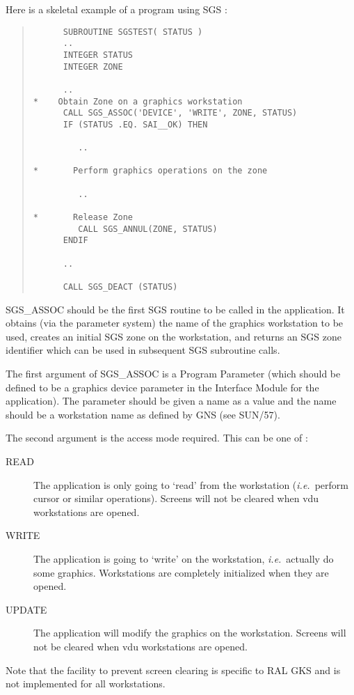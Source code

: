 Here is a skeletal example of a program using SGS :
\begin{quote}
\begin{verbatim}
      SUBROUTINE SGSTEST( STATUS )
      ..
      INTEGER STATUS
      INTEGER ZONE

      ..
*    Obtain Zone on a graphics workstation
      CALL SGS_ASSOC('DEVICE', 'WRITE', ZONE, STATUS)
      IF (STATUS .EQ. SAI__OK) THEN

         ..

*       Perform graphics operations on the zone

         ..

*       Release Zone
         CALL SGS_ANNUL(ZONE, STATUS)
      ENDIF

      ..

      CALL SGS_DEACT (STATUS)

\end{verbatim}
\end{quote}

SGS\_ASSOC should be the first SGS routine to be called in the application.
It obtains (via the parameter system) the name of the graphics workstation 
to be used, creates an initial SGS zone on the workstation, and returns an
SGS zone identifier which can be used in subsequent SGS subroutine calls.

The first argument of SGS\_ASSOC is a Program Parameter (which should be defined
to be a graphics device parameter in the Interface Module for the application).
The parameter should be given a name as a value and the name should be a
workstation name as defined by GNS (see SUN/57).

The second argument is the access mode required. This can be one of :
\begin{description}
\item[READ]   The application is only going to `read' from the workstation
({\em i.e.}\ perform cursor or similar operations). 
Screens will not be cleared when vdu workstations are opened.
\item[WRITE]  The application is going to `write' on the workstation,
{\em i.e.}\ actually do some graphics. 
Workstations are completely initialized when they are opened.
\item[UPDATE] The application will modify the graphics on the workstation.
Screens will not be cleared when vdu workstations are opened.
\end{description}

Note that the facility to prevent screen clearing is specific to RAL GKS and
is not implemented for all workstations.

